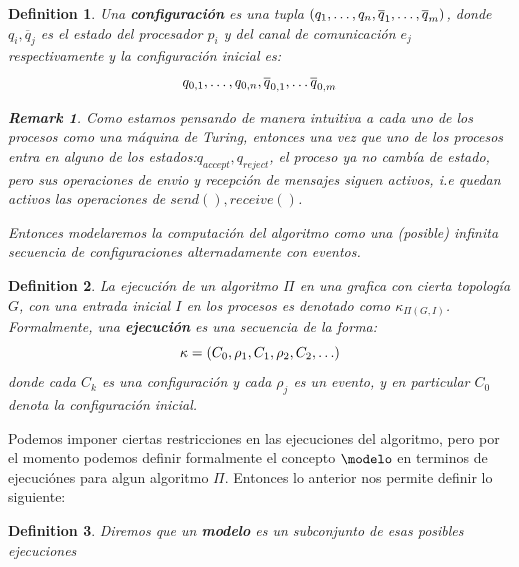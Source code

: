 \documentclass[10pt]{report}
\newtheorem*{remark}{Remark}
\newtheorem{definition}{Definition}
\begin{document}
    \begin{definition}
        Una \textbf{configuración} es una tupla $(q_{1},\mathellipsis,q_{n},\overline{q}_{1},\mathellipsis,\overline{q}_{m})$,
        donde $q_{i},\overline{q}_{j}$ es el estado del procesador $p_{i}$ y del canal de comunicación $e_{j}$ respectivamente
        y la configuración inicial es:
        \begin{equation}
        q_{0,1},\mathellipsis,q_{0,n},\overline{q}_{0,1},\mathellipsis \overline{q}_{0,m}\label{eq:equation5}
        \end{equation}

        \begin{remark}
            Como estamos pensando de manera intuitiva a cada uno de los procesos como una máquina de Turing, entonces
            una vez que uno de los procesos entra en alguno de los estados:\space $q_{accept},q_{reject}$, el proceso ya no cambía
            de estado, pero sus operaciones de envio y recepción de mensajes siguen activos, i.e quedan activos las
            operaciones de $send(),receive()$.
        \end{remark}
        \newline
        Entonces modelaremos la computación del algoritmo como una (posible) infinita secuencia de configuraciones
        alternadamente con eventos.
    \end{definition}
    \theoremstyle{definition}
    \begin{definition}
        La ejecución de un algoritmo $\Pi$ en una grafica con cierta topología
        $G$, con una entrada inicial $I$ en los procesos es denotado como $\kappa_{\Pi(G,I)}$.
        Formalmente, una \textbf{ejecución} es una secuencia de la forma:
        \begin{equation}
            \kappa = (C_{0},\rho_{1},C_{1},\rho_{2},C_{2},\mathellipsis)\label{eq:equation3}
        \end{equation}
        donde cada $C_{k}$ es una configuración y cada $\rho_{j}$ es un evento,
        y en particular $C_{0}$ denota la configuración inicial.
    \end{definition}
    Podemos imponer ciertas restricciones en las ejecuciones del algoritmo, pero por el momento
    podemos definir formalmente el concepto $\modelo$ en terminos de ejecuciónes para algun algoritmo
    $\Pi$.\newline
    Entonces lo anterior nos permite definir lo siguiente:
    \begin{definition}
        Diremos que un \textbf{modelo} es un subconjunto de esas posibles ejecuciones
    \end{definition}
\end{document}
